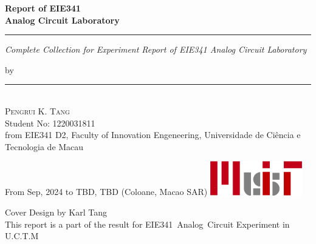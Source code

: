 \documentclass[
    a4paper,
    11pt,
    twoside=true
    ]{article}
\begin{document}


\begin{titlepage}
    \ActivateWarningFilters[latex]

    \parbox{1\textwidth}{ %
		{\Huge\bfseries Report of EIE341 \\[0.15\baselineskip] 
            Analog Circuit Laboratory}\\[0.15\baselineskip] %
		\rule{1\textwidth}{1pt} %
        {\Large\textit{Complete Collection for Experiment Report of EIE341 Analog Circuit Laboratory}}
        \newline
    }
    \vspace{100pt} %
    \parbox{1\textwidth}{
        {\large by}\\[1.5\baselineskip]
        {\rule[1pt]{200pt}{1pt}} \\[1.25pt]
        {\huge\textsc{Pengrui K. Tang}
            }\\
        {\large{Student No: 1220031811}} \\
        \large from EIE341 D2, \newline
        Faculty of Innovation Engeneering, \newline
        Universidade de Ciência e Tecnologia de Macau
    }
		

    \vspace*{\fill}
		From Sep, 2024 to TBD, TBD \newline 
        (Coloane, Macao SAR)
        \vspace{0.7\baselineskip}\newline
        \includegraphics[width = 40mm]{../Header/MUIT_origin.png}\par
        {\small Cover Design by Karl Tang}\\[0.25pt]
        {\small This report is a part of the result for}
        {\small EIE341~Analog~Circuit Experiment in U.C.T.M}\\[0.25pt]

\end{titlepage}
\blankpage
\end{document}
